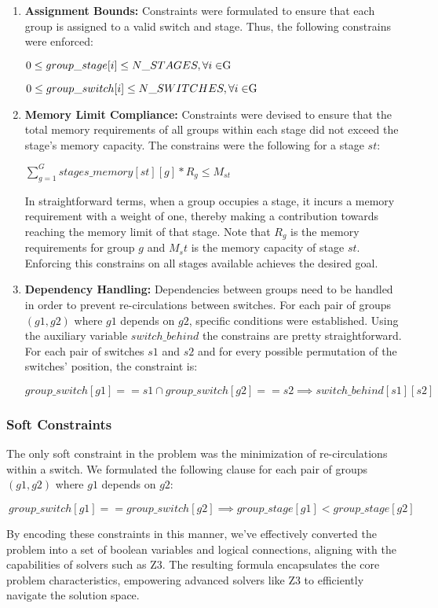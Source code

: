 \begin{enumerate}
    \item \textbf{Assignment Bounds:} Constraints were formulated to ensure that each group is assigned to a valid switch and stage. Thus, the following constrains were enforced:
    \begin{center}
        \(0 \leq group\_stage[i] \le N\_STAGES, \forall i \in $G$ \)
        
        \(0 \leq group\_switch[i] \le N\_SWITCHES, \forall i \in $G$ \)
    \end{center}

    \item \textbf{Memory Limit Compliance:} Constraints were devised to ensure that the total memory requirements of all groups within each stage did not exceed the stage's memory capacity. The constrains were the following for a stage $st$:
    \begin{center}
        \(\sum_{g=1}^{G} stages\_memory[st][g] * R_g \leq M_{st} \)
    \end{center}
    In straightforward terms, when a group occupies a stage, it incurs a memory requirement with a weight of one, thereby making a contribution towards reaching the memory limit of that stage. Note that $R_g$ is the memory requirements for group $g$ and $M_st$ is the memory capacity of stage $st$. Enforcing this constrains on all stages available achieves the desired goal.

    \item \textbf{Dependency Handling:} Dependencies between groups need to be handled in order to prevent re-circulations between switches. For each pair of groups \((g1, g2)\) where \(g1\) depends on \(g2\), specific conditions were established. Using the auxiliary variable $switch\_behind$ the constrains are pretty straightforward. For each pair of switches $s1$ and $s2$ and for every possible permutation of the switches' position, the constraint is:
    \begin{center}
        \(group\_switch[g1] == s1 \cap group\_switch[g2] == s2 \implies switch\_behind[s1][s2]  \)
        
    \end{center}
\end{enumerate}

\subsubsection{Soft Constraints}    

The only soft constraint in the problem was the minimization of re-circulations within a switch. We formulated the following clause for each pair of groups \((g1, g2)\) where \(g1\) depends on \(g2\):
\begin{center}
    \(\ group\_switch[g1] == group\_switch[g2] \implies group\_stage[g1] < group\_stage[g2]  \)
\end{center}

By encoding these constraints in this manner, we've effectively converted the problem into a set of boolean variables and logical connections, aligning with the capabilities of solvers such as Z3. The resulting formula encapsulates the core problem characteristics, empowering advanced solvers like Z3 to efficiently navigate the solution space.